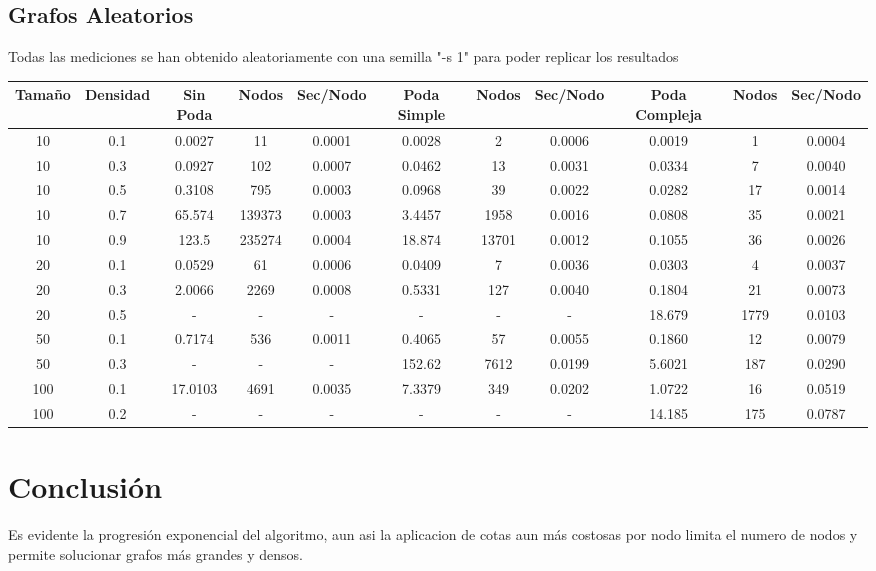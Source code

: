 \documentclass{article}
\begin{document}
\subsection{Grafos Aleatorios}
Todas las mediciones se han obtenido aleatoriamente con una semilla "-s 1" para poder replicar los resultados
\newline\newline
\hspace*{-4.2cm}
	\begin{tabular}{| c | c | c c c| c c c | c c c |}
		\hline
		Tamaño & Densidad & Sin Poda & Nodos & Sec/Nodo & Poda Simple & Nodos & Sec/Nodo & Poda Compleja & Nodos & Sec/Nodo \\
		\hline\hline
		10 & 0.1 & 0.0027 & 11 & 0.0001 & 0.0028 & 2 & 0.0006 & 0.0019 & 1 & 0.0004 \\
		\hline
		10 & 0.3 & 0.0927 & 102 & 0.0007 & 0.0462 & 13 & 0.0031 & 0.0334 & 7 & 0.0040 \\
		\hline
		10 & 0.5 & 0.3108 & 795 & 0.0003 & 0.0968 & 39 & 0.0022 & 0.0282 & 17 & 0.0014 \\
		\hline
		10 & 0.7 & 65.574 & 139373 & 0.0003 & 3.4457 & 1958 & 0.0016 & 0.0808 & 35 & 0.0021 \\
		\hline
		10 & 0.9 & 123.5 & 235274 & 0.0004 & 18.874 & 13701 & 0.0012 & 0.1055 & 36 & 0.0026 \\
		\hline
		\hline
		20 & 0.1 & 0.0529 & 61 & 0.0006 & 0.0409 & 7 & 0.0036 & 0.0303 & 4 & 0.0037 \\
		\hline
		20 & 0.3 & 2.0066 & 2269 & 0.0008 & 0.5331 & 127 & 0.0040 & 0.1804 & 21 & 0.0073 \\
		\hline
		20 & 0.5 & - & - & - & - & - & - & 18.679 & 1779 & 0.0103 \\
		\hline
		\hline
		50 & 0.1 & 0.7174 & 536 & 0.0011 & 0.4065 & 57 & 0.0055 & 0.1860 & 12 & 0.0079 \\
		\hline
		50 & 0.3 & - & - & - & 152.62 & 7612 & 0.0199 & 5.6021 & 187 & 0.0290 \\
		\hline \hline
		100 & 0.1 & 17.0103 & 4691 & 0.0035 & 7.3379 & 349 & 0.0202 & 1.0722 & 16 & 0.0519 \\
		\hline
		100 & 0.2 & - & - & - & - & - & - & 14.185 & 175 & 0.0787 \\
		\hline
	\end{tabular}
\hspace*{-4.2cm}
\section{Conclusión}
Es evidente la progresión exponencial del algoritmo, aun asi la aplicacion de cotas aun más costosas por nodo limita el numero de nodos y permite solucionar grafos más grandes y densos.
\end{document}
